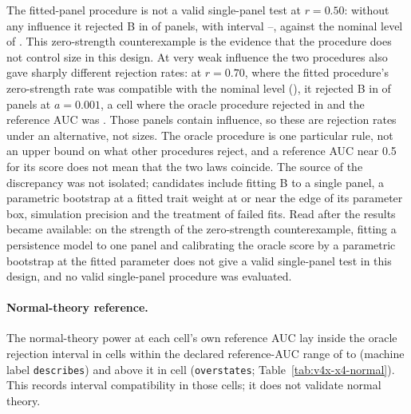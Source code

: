 The fitted-panel procedure is not a valid single-panel test at $r=0.50$: without any influence it rejected B in  of panels, with interval --, against the nominal level of . This zero-strength counterexample is the evidence that the procedure does not control size in this design. At very weak influence the two procedures also gave sharply different rejection rates: at $r=0.70$, where the fitted procedure's zero-strength rate was compatible with the nominal level (), it rejected B in  of panels at $a=0.001$, a cell where the oracle procedure rejected in  and the reference AUC was . Those panels contain influence, so these are rejection rates under an alternative, not sizes. The oracle procedure is one particular rule, not an upper bound on what other procedures reject, and a reference AUC near 0.5 for its score does not mean that the two laws coincide. The source of the discrepancy was not isolated; candidates include fitting B to a single panel, a parametric bootstrap at a fitted trait weight at or near the edge of its parameter box, simulation precision and the treatment of failed fits. Read after the results became available: on the strength of the zero-strength counterexample, fitting a persistence model to one panel and calibrating the oracle score by a parametric bootstrap at the fitted parameter does not give a valid single-panel test in this design, and no valid single-panel procedure was evaluated.

\paragraph{Normal-theory reference.}
The normal-theory power at each cell's own reference AUC lay inside the oracle rejection interval in  cells within the declared reference-AUC range of  to  (machine label \texttt{describes}) and above it in  cell (\texttt{overstates}; Table~\ref{tab:v4x-x4-normal}). This records interval compatibility in those cells; it does not validate normal theory.

